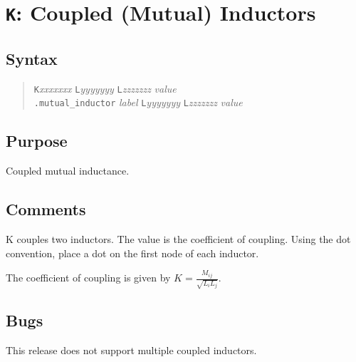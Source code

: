 %
%
%
%
\section{{\tt K}: Coupled (Mutual) Inductors}
\subsection{Syntax}
\begin{verse}
{\tt K}{\it xxxxxxx} {\tt L}{\it yyyyyyy} {\tt L}{\it zzzzzzz}
	{\it value}\\
{\tt .mutual\_inductor} {\it label}
	{\tt L}{\it yyyyyyy} {\tt L}{\it zzzzzzz}	{\it value}
\end{verse}
\subsection{Purpose}

Coupled mutual inductance.
\subsection{Comments}

K couples two inductors.  The value is the coefficient of coupling.  Using the dot convention, place a dot on the first node of each inductor.

The coefficient of coupling is given by $K = \frac{M_{ij}}{\sqrt{L_i L_j}}$.
\subsection{Bugs}

This release does not support multiple coupled inductors.
